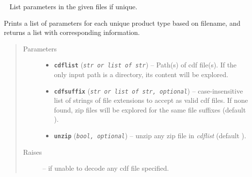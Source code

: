 \documentclass[letterpaper,10pt,english]{sphinxhowto}
\begin{document}

\begin{fulllineitems}
\label{swtools_doc:swtools.getCDFparamlist}~\label{swtools_doc:getcdfparamlist}
List parameters in the given files if unique.

Prints a list of parameters for each unique product type based on
filename, and returns a list with corresponding information.
\begin{quote}\begin{description}
\item[{Parameters}] \leavevmode\begin{itemize}
\item {} 
\textbf{\texttt{cdflist}} (\emph{\texttt{str or list of str}}) -- Path(s) of cdf file(s). If the only input path is a directory,
its content will be explored.

\item {} 
\textbf{\texttt{cdfsuffix}} (\emph{\texttt{str or list of str, optional}}) -- case-insensitive list of strings of file extensions to accept
as valid cdf files. If none found, zip files will be explored
for the same file suffixes (default ).

\item {} 
\textbf{\texttt{unzip}} (\emph{\texttt{bool, optional}}) -- unzip any zip file in \emph{cdflist} (default ).

\end{itemize}

\item[{Raises}] \leavevmode
{} --
if unable to decode any cdf file specified.

\end{description}\end{quote}

\end{fulllineitems}

\end{document}
